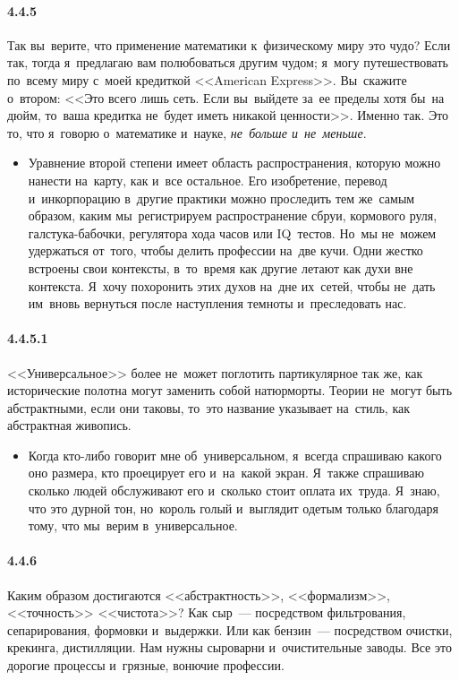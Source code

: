 \paragraph{4.4.5}\hypertarget{par:4.4.5}{} Так вы~верите, что применение математики к~физическому миру это чудо? Если так, тогда я~предлагаю вам полюбоваться другим чудом; я~могу путешествовать по~всему миру с~моей кредиткой <<American Express>>. Вы~скажите о~втором: <<Это всего лишь сеть. Если вы~выйдете за~ее пределы хотя бы~на дюйм, то~ваша кредитка не~будет иметь никакой ценности>>. Именно так. Это то, что я~говорю о~математике и~науке, {\itshape не~больше и~не~меньше}. 
	\begin{itemize}
	\item 
	Уравнение второй степени имеет область распространения, которую можно нанести на~карту, как и~все остальное. Его изобретение, перевод и~инкорпорацию в~другие практики можно проследить тем же~самым образом, каким мы~регистрируем распространение сбруи, кормового руля, галстука-бабочки, регулятора хода часов или IQ~тестов. Но~мы не~можем удержаться от~того, чтобы делить профессии на~две кучи. Одни жестко встроены свои контексты, в~то~время как другие летают как духи вне контекста. Я~хочу похоронить этих духов на~дне их~сетей, чтобы не~дать им~вновь вернуться после наступления темноты и~преследовать нас.
	\end{itemize}	

\paragraph{4.4.5.1}\hypertarget{par:4.4.5.1}{} <<Универсальное>> более не~может поглотить партикулярное так же, как исторические полотна могут заменить собой натюрморты. Теории не~могут быть абстрактными, если они таковы, то~это название указывает на~стиль, как абстрактная живопись. 
	\begin{itemize}
	\item 
	Когда кто-либо говорит мне об~универсальном, я~всегда спрашиваю какого оно размера, кто проецирует его и~на~какой экран. Я~также спрашиваю сколько людей обслуживают его и~сколько стоит оплата их~труда. Я~знаю, что это дурной тон, но~король голый и~выглядит одетым только благодаря тому, что мы~верим в~универсальное.
	\end{itemize}	

\paragraph{4.4.6}\hypertarget{par:4.4.6}{} Каким образом достигаются <<абстрактность>>, <<формализм>>, <<точность>> <<чистота>>? Как сыр~--- посредством фильтрования, сепарирования, формовки и~выдержки. Или как бензин~--- посредством очистки, крекинга, дистилляции. Нам нужны сыроварни и~очистительные заводы. Все это дорогие процессы и~грязные, вонючие профессии.

